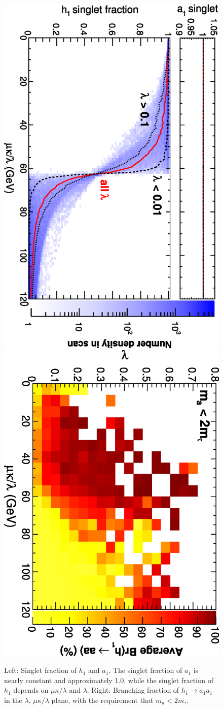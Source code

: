 \documentclass[aps,prl,twocolumn,nofootinbib,superscriptaddress]{revtex4}
\begin{document}
%


\begin{figure}
\includegraphics[height=0.52\linewidth, angle=90]{plots/newbranching/scomp13_vs_mkoverl.eps}
\includegraphics[height=0.46\linewidth, angle=90]{plots/newbranching/brhaa_vs_lambda_vs_mkoverl.eps}
\caption{Left: Singlet fraction of $h_1$ and $a_1$.  The singlet fraction of
  $a_1$ is nearly constant and approximately 1.0, while the singlet
  fraction of $h_1$ depends on $\mu\kappa/\lambda$ and $\lambda$. 
Right: Branching fraction of $h_1 \to a_1a_1$ in the $\lambda$, $\mu\kappa/\lambda$
  plane, with the requirement that $m_a < 2m_\tau$. \label{fig:singlet}}
\end{figure}
\end{document}
